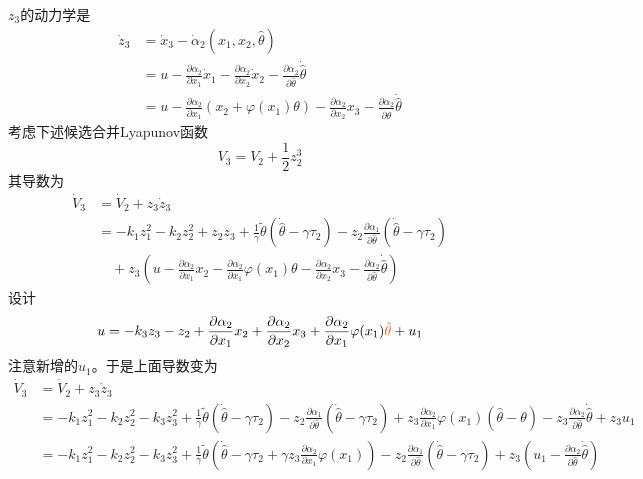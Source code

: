 
$z_3$的动力学是
\begin{align*}
    \dot{z}_3&=\dot{x}_3-\dot{\alpha}_2(x_1,x_2,\hat{\theta})\\
    &=u-\frac{\partial\alpha_2}{\partial x_1}\dot{x}_1-\frac{\partial\alpha_2}{\partial x_2}\dot{x}_2 - \frac{\partial\alpha_2}{\partial \hat{\theta}}\dot{\hat{\theta}}\\
    &=u-\frac{\partial\alpha_2}{\partial x_1}(x_2+\varphi(x_1)\theta)-\frac{\partial\alpha_2}{\partial x_2}x_3 - \frac{\partial\alpha_2}{\partial \hat{\theta}}\dot{\hat{\theta}}
\end{align*}
考虑下述候选合并Lyapunov函数
\[ V_3 = V_2 + \frac{1}{2} z^3_2 \]
其导数为
\begin{align*}
    \dot{V}_3&=\dot{V}_2+z_3\dot{z}_3\\
    &=-k_1z_1^2-k_2z_2^2+z_2z_3+\frac{1}{\gamma}\tilde{\theta}(\dot{\hat{\theta}}-\gamma \tau_2)-z_2\frac{\partial
  \alpha_1}{\partial \hat{\theta} }(\dot{\hat{\theta}}-\gamma\tau_2)\\
  &\quad +z_3\left(u-\frac{\partial\alpha_2}{\partial x_1}x_2-\frac{\partial\alpha_2}{\partial x_1}\varphi(x_1)\theta-\frac{\partial\alpha_2}{\partial x_2}x_3 - \frac{\partial\alpha_2}{\partial \hat{\theta}}\dot{\hat{\theta}}\right)
\end{align*}
设计
\[u=-k_3z_3-z_2+\frac{\partial\alpha_2}{\partial x_1}x_2+\frac{\partial\alpha_2}{\partial x_2}x_3+\frac{\partial\alpha_2}{\partial x_1}\varphi(x_1)\textcolor{second}{\hat\theta}+u_1\]
注意新增的$u_1$。于是上面导数变为
\begin{align*}
    \dot{V}_3&=\dot{V}_2+z_3\dot{z}_3\\
    &=-k_1z_1^2-k_2z_2^2-k_3z_3^2+\frac{1}{\gamma}\tilde{\theta}(\dot{\hat{\theta}}-\gamma \tau_2)-z_2\frac{\partial
  \alpha_1}{\partial \hat{\theta} }(\dot{\hat{\theta}}-\gamma\tau_2) +z_3\frac{\partial\alpha_2}{\partial x_1}\varphi(x_1)(\hat{\theta}-\theta)- z_3\frac{\partial\alpha_2}{\partial \hat{\theta}}\dot{\hat{\theta}}+z_3u_1\\
  &=-k_1z_1^2-k_2z_2^2-k_3z_3^2+\frac{1}{\gamma}\tilde{\theta}\left(\dot{\hat{\theta}}-\gamma \tau_2+\gamma z_3\frac{\partial\alpha_2}{\partial x_1}\varphi(x_1)\right)-z_2\frac{\partial
  \alpha_1}{\partial \hat{\theta} }(\dot{\hat{\theta}}-\gamma\tau_2) +z_3\left(u_1- \frac{\partial\alpha_2}{\partial \hat{\theta}}\dot{\hat{\theta}}\right)
\end{align*}

